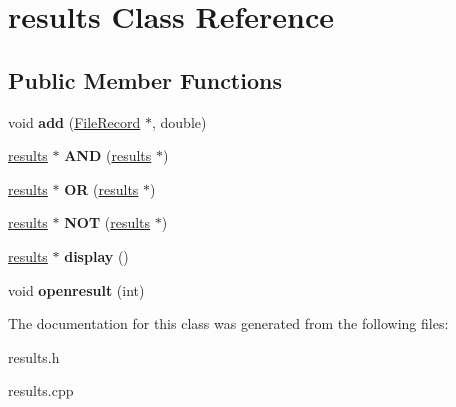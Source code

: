 \hypertarget{classresults}{\section{results Class Reference}
\label{classresults}
}
\subsection*{Public Member Functions}
\begin{DoxyCompactItemize}
\item 
\hypertarget{classresults_a0e4d38b1a41064d0eef3b39290d459c2}{void {\bfseries add} (\hyperlink{classFileRecord}{File\-Record} $\ast$, double)}\label{classresults_a0e4d38b1a41064d0eef3b39290d459c2}

\item 
\hypertarget{classresults_abe3d7a331a246efc7e045c6f4b4677f8}{\hyperlink{classresults}{results} $\ast$ {\bfseries A\-N\-D} (\hyperlink{classresults}{results} $\ast$)}\label{classresults_abe3d7a331a246efc7e045c6f4b4677f8}

\item 
\hypertarget{classresults_aaca7df4883d9d88a7ec97d1cac63ad39}{\hyperlink{classresults}{results} $\ast$ {\bfseries O\-R} (\hyperlink{classresults}{results} $\ast$)}\label{classresults_aaca7df4883d9d88a7ec97d1cac63ad39}

\item 
\hypertarget{classresults_a2da077526ccff5d479e9a9ddd2696296}{\hyperlink{classresults}{results} $\ast$ {\bfseries N\-O\-T} (\hyperlink{classresults}{results} $\ast$)}\label{classresults_a2da077526ccff5d479e9a9ddd2696296}

\item 
\hypertarget{classresults_a0aea048dfe8abd06a61d8880c8db58a0}{\hyperlink{classresults}{results} $\ast$ {\bfseries display} ()}\label{classresults_a0aea048dfe8abd06a61d8880c8db58a0}

\item 
\hypertarget{classresults_ad820ad21c5368fcc381233626f166b38}{void {\bfseries openresult} (int)}\label{classresults_ad820ad21c5368fcc381233626f166b38}

\end{DoxyCompactItemize}


The documentation for this class was generated from the following files\-:\begin{DoxyCompactItemize}
\item 
results.\-h\item 
results.\-cpp\end{DoxyCompactItemize}
